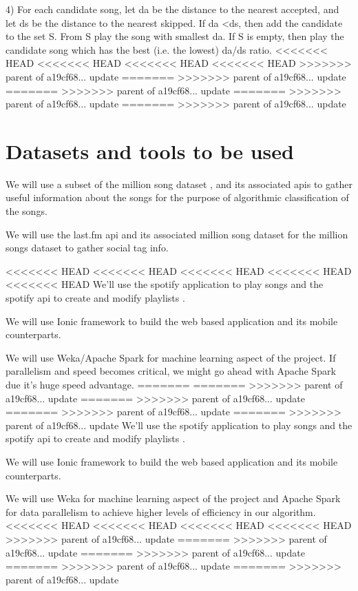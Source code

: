 \documentclass{article}
\begin{document}
4) For each candidate song, let da be the distance to the nearest accepted, and let ds be the distance to the nearest skipped. If da \textless ds, then add the candidate to the set S. From S play the song with smallest da. If S is empty, then play the candidate song which has the best (i.e. the lowest) da/ds ratio.\cite{Tim05dynamicplaylist}
<<<<<<< HEAD
<<<<<<< HEAD
<<<<<<< HEAD
<<<<<<< HEAD
>>>>>>> parent of a19cf68... update
=======
>>>>>>> parent of a19cf68... update
=======
>>>>>>> parent of a19cf68... update
=======
>>>>>>> parent of a19cf68... update
=======
>>>>>>> parent of a19cf68... update

%
\section{Datasets and tools to be used}

We will use a subset of the million song dataset \cite{msd}, and its associated apis to gather useful information about the songs for the purpose of algorithmic classification of the songs.

We will use the last.fm api \cite{lastfm} and its associated million song dataset \cite{lastFmDataset} for the million songs dataset to gather social tag info.

<<<<<<< HEAD
<<<<<<< HEAD
<<<<<<< HEAD
<<<<<<< HEAD
<<<<<<< HEAD
We'll use the spotify application \cite{spotify} to play songs and the spotify api to create and modify playlists \cite{spotifyApi}.

We will use Ionic framework to build the web based application and its mobile counterparts.

We will use Weka/Apache Spark for machine learning aspect of the project. If parallelism and speed becomes critical, we might go ahead with Apache Spark due it's huge speed advantage.
=======
=======
>>>>>>> parent of a19cf68... update
=======
>>>>>>> parent of a19cf68... update
=======
>>>>>>> parent of a19cf68... update
=======
>>>>>>> parent of a19cf68... update
We’ll use the spotify application \cite{spotify} to play songs and the spotify api to create and modify playlists \cite{spotifyApi}.

We will use Ionic framework to build the web based application and its mobile counterparts.

We will use Weka for machine learning aspect of the project and Apache Spark for data parallelism to achieve higher levels of efficiency in our algorithm.
<<<<<<< HEAD
<<<<<<< HEAD
<<<<<<< HEAD
<<<<<<< HEAD
>>>>>>> parent of a19cf68... update
=======
>>>>>>> parent of a19cf68... update
=======
>>>>>>> parent of a19cf68... update
=======
>>>>>>> parent of a19cf68... update
=======
>>>>>>> parent of a19cf68... update
\end{document}
